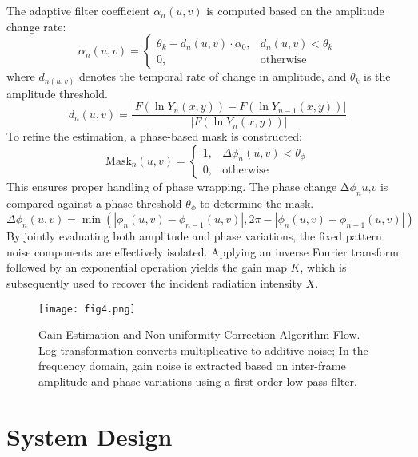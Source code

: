 \documentclass[a4paper,fleqn]{cas-dc}
\begin{document}
The adaptive filter coefficient $\alpha_n\left(u,v\right)$ is computed based on the amplitude change rate:
\begin{equation}
\alpha_n(u,v) = 
\begin{cases}
\theta_k - d_n(u,v) \cdot \alpha_0, & d_n(u,v) < \theta_k \\
0, & \text{otherwise}
\end{cases}
\end{equation}
where $d_{n\left(u,v\right)}$ denotes the temporal rate of change in amplitude, and $\theta_k$ is the amplitude threshold.
\begin{equation}
d_n(u,v) = \frac{ \left| F\left( \ln Y_n(x,y) \right) - F\left( \ln Y_{n-1}(x,y) \right) \right| }
{ \left| F\left( \ln Y_n(x,y) \right) \right| }
\end{equation}
To refine the estimation, a phase-based mask is constructed:
\begin{equation}
\text{Mask}_n(u,v) = 
\begin{cases}
1, & \Delta\phi_n(u,v) < \theta_\phi \\
0, & \text{otherwise}
\end{cases}
\end{equation}
This ensures proper handling of phase wrapping. The phase change $\mathrm{\Delta}\phi_nu$,$v$ is compared against a phase threshold $\theta_\phi$ to determine the mask.
\begin{equation}
\Delta\phi_n(u,v) = \min\left( |\phi_n(u,v) - \phi_{n-1}(u,v)|, 2\pi - |\phi_n(u,v) - \phi_{n-1}(u,v)| \right)
\end{equation}
By jointly evaluating both amplitude and phase variations, the fixed pattern noise components are effectively isolated. Applying an inverse Fourier transform followed by an exponential operation yields the gain map $K$, which is subsequently used to recover the incident radiation intensity $X$.

\begin{figure}[ht]
    \centering
    \texttt{[image: fig4.png]}
    \caption{Gain Estimation and Non-uniformity Correction Algorithm Flow. Log transformation converts multiplicative to additive noise; In the frequency domain, gain noise is extracted based on inter-frame amplitude and phase variations using a first-order low-pass filter.}
    \label{fig:fig4}
\end{figure}

\section{System Design}
\end{document}
